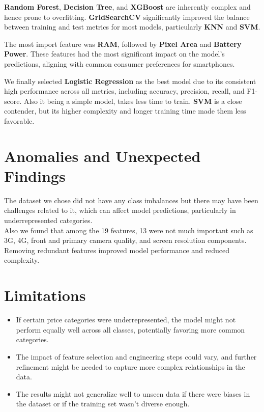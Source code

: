 \documentclass[12pt]{report}
\begin{document}
\textbf{Random Forest}, \textbf{Decision Tree}, and \textbf{XGBoost} are inherently complex and hence prone to overfitting. \textbf{GridSearchCV} significantly improved the balance between training and test metrics for most models, particularly \textbf{KNN} and \textbf{SVM}.

The most import feature was \textbf{RAM}, followed by \textbf{Pixel Area} and \textbf{Battery Power}. These features had the most significant impact on the model's predictions, aligning with common consumer preferences for smartphones.

We finally selected \textbf{Logistic Regression} as the best model due to its consistent high performance across all metrics, including accuracy, precision, recall, and F1-score. Also it being a simple model, takes less time to train. \textbf{SVM} is a close contender, but its higher complexity and longer training time made them less favorable.

\section{Anomalies and Unexpected Findings}
The dataset we chose did not have any class imbalances but there may have been challenges related to it, which can affect model predictions, particularly in underrepresented categories. \\
Also we found that among the 19 features, 13 were not much important such as 3G, 4G, front and primary camera quality, and screen resolution components. Removing redundant features improved model performance and reduced complexity. \\	
\section{Limitations}
\vspace{-0.5em}
\begin{itemize}
	\setlength\itemsep{-1.25em}
	\item  If certain price categories were underrepresented, the model might not perform equally well across all classes, potentially favoring more common categories.
	\item The impact of feature selection and engineering steps could vary, and further refinement might be needed to capture more complex relationships in the data.
	\item The results might not generalize well to unseen data if there were biases in the dataset or if the training set wasn't diverse enough.
\end{itemize}
\end{document}
